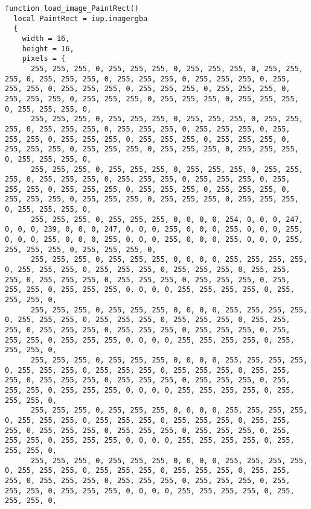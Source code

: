 \documentclass{ctexart}
\begin{document}
\begin{lstlisting}
function load_image_PaintRect()
  local PaintRect = iup.imagergba
  {
    width = 16,
    height = 16,
    pixels = {
      255, 255, 255, 0, 255, 255, 255, 0, 255, 255, 255, 0, 255, 255, 255, 0, 255, 255, 255, 0, 255, 255, 255, 0, 255, 255, 255, 0, 255, 255, 255, 0, 255, 255, 255, 0, 255, 255, 255, 0, 255, 255, 255, 0, 255, 255, 255, 0, 255, 255, 255, 0, 255, 255, 255, 0, 255, 255, 255, 0, 255, 255, 255, 0, 
      255, 255, 255, 0, 255, 255, 255, 0, 255, 255, 255, 0, 255, 255, 255, 0, 255, 255, 255, 0, 255, 255, 255, 0, 255, 255, 255, 0, 255, 255, 255, 0, 255, 255, 255, 0, 255, 255, 255, 0, 255, 255, 255, 0, 255, 255, 255, 0, 255, 255, 255, 0, 255, 255, 255, 0, 255, 255, 255, 0, 255, 255, 255, 0, 
      255, 255, 255, 0, 255, 255, 255, 0, 255, 255, 255, 0, 255, 255, 255, 0, 255, 255, 255, 0, 255, 255, 255, 0, 255, 255, 255, 0, 255, 255, 255, 0, 255, 255, 255, 0, 255, 255, 255, 0, 255, 255, 255, 0, 255, 255, 255, 0, 255, 255, 255, 0, 255, 255, 255, 0, 255, 255, 255, 0, 255, 255, 255, 0, 
      255, 255, 255, 0, 255, 255, 255, 0, 0, 0, 0, 254, 0, 0, 0, 247, 0, 0, 0, 239, 0, 0, 0, 247, 0, 0, 0, 255, 0, 0, 0, 255, 0, 0, 0, 255, 0, 0, 0, 255, 0, 0, 0, 255, 0, 0, 0, 255, 0, 0, 0, 255, 0, 0, 0, 255, 255, 255, 255, 0, 255, 255, 255, 0, 
      255, 255, 255, 0, 255, 255, 255, 0, 0, 0, 0, 255, 255, 255, 255, 0, 255, 255, 255, 0, 255, 255, 255, 0, 255, 255, 255, 0, 255, 255, 255, 0, 255, 255, 255, 0, 255, 255, 255, 0, 255, 255, 255, 0, 255, 255, 255, 0, 255, 255, 255, 0, 0, 0, 0, 255, 255, 255, 255, 0, 255, 255, 255, 0, 
      255, 255, 255, 0, 255, 255, 255, 0, 0, 0, 0, 255, 255, 255, 255, 0, 255, 255, 255, 0, 255, 255, 255, 0, 255, 255, 255, 0, 255, 255, 255, 0, 255, 255, 255, 0, 255, 255, 255, 0, 255, 255, 255, 0, 255, 255, 255, 0, 255, 255, 255, 0, 0, 0, 0, 255, 255, 255, 255, 0, 255, 255, 255, 0, 
      255, 255, 255, 0, 255, 255, 255, 0, 0, 0, 0, 255, 255, 255, 255, 0, 255, 255, 255, 0, 255, 255, 255, 0, 255, 255, 255, 0, 255, 255, 255, 0, 255, 255, 255, 0, 255, 255, 255, 0, 255, 255, 255, 0, 255, 255, 255, 0, 255, 255, 255, 0, 0, 0, 0, 255, 255, 255, 255, 0, 255, 255, 255, 0, 
      255, 255, 255, 0, 255, 255, 255, 0, 0, 0, 0, 255, 255, 255, 255, 0, 255, 255, 255, 0, 255, 255, 255, 0, 255, 255, 255, 0, 255, 255, 255, 0, 255, 255, 255, 0, 255, 255, 255, 0, 255, 255, 255, 0, 255, 255, 255, 0, 255, 255, 255, 0, 0, 0, 0, 255, 255, 255, 255, 0, 255, 255, 255, 0, 
      255, 255, 255, 0, 255, 255, 255, 0, 0, 0, 0, 255, 255, 255, 255, 0, 255, 255, 255, 0, 255, 255, 255, 0, 255, 255, 255, 0, 255, 255, 255, 0, 255, 255, 255, 0, 255, 255, 255, 0, 255, 255, 255, 0, 255, 255, 255, 0, 255, 255, 255, 0, 0, 0, 0, 255, 255, 255, 255, 0, 255, 255, 255, 0, 

\end{lstlisting}
\end{document}
